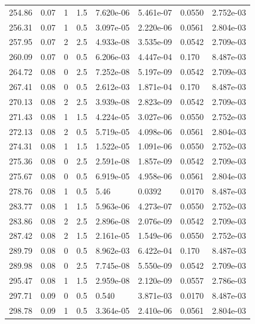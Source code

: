 \documentclass[preview]{standalone}
\begin{document}
{{{\begin{tabular}{L{1.2cm}C{1.2cm} C{0.3cm}C{0.5cm} C{1.4cm}C{1.4cm} C{1.4cm}C{1.4cm}}
  254.86  &  0.07  & 1     & 1.5 &  7.620e-06  & 5.461e-07  & 0.0550 &  2.752e-03   \\ 
  256.31  &  0.07  & 1     & 0.5 &  3.097e-05  & 2.220e-06  & 0.0561 &  2.804e-03   \\ 
  257.95  &  0.07  & 2     & 2.5 &  4.933e-08  & 3.535e-09  & 0.0542 &  2.709e-03   \\ 
  260.09  &  0.07  & 0     & 0.5 &  6.206e-03  & 4.447e-04  & 0.170 &  8.487e-03   \\ 
  264.72  &  0.08  & 0     & 2.5 &  7.252e-08  & 5.197e-09  & 0.0542 &  2.709e-03   \\ 
  267.41  &  0.08  & 0     & 0.5 &  2.612e-03  & 1.871e-04  & 0.170 &  8.487e-03   \\ 
  270.13  &  0.08  & 2     & 2.5 &  3.939e-08  & 2.823e-09  & 0.0542 &  2.709e-03   \\ 
  271.43  &  0.08  & 1     & 1.5 &  4.224e-05  & 3.027e-06  & 0.0550 &  2.752e-03   \\ 
  272.13  &  0.08  & 2     & 0.5 &  5.719e-05  & 4.098e-06  & 0.0561 &  2.804e-03   \\ 
  274.31  &  0.08  & 1     & 1.5 &  1.522e-05  & 1.091e-06  & 0.0550 &  2.752e-03   \\ 
  275.36  &  0.08  & 0     & 2.5 &  2.591e-08  & 1.857e-09  & 0.0542 &  2.709e-03   \\ 
  275.67  &  0.08  & 0     & 0.5 &  6.919e-05  & 4.958e-06  & 0.0561 &  2.804e-03   \\ 
  278.76  &  0.08  & 1     & 0.5 &  5.46  & 0.0392  & 0.0170 &  8.487e-03   \\ 
  283.77  &  0.08  & 1     & 1.5 &  5.963e-06  & 4.273e-07  & 0.0550 &  2.752e-03   \\ 
  283.86  &  0.08  & 2     & 2.5 &  2.896e-08  & 2.076e-09  & 0.0542 &  2.709e-03   \\ 
  287.42  &  0.08  & 2     & 1.5 &  2.161e-05  & 1.549e-06  & 0.0550 &  2.752e-03   \\ 
  289.79  &  0.08  & 0     & 0.5 &  8.962e-03  & 6.422e-04  & 0.170 &  8.487e-03   \\ 
  289.98  &  0.08  & 0     & 2.5 &  7.745e-08  & 5.550e-09  & 0.0542 &  2.709e-03   \\ 
  295.47  &  0.08  & 1     & 1.5 &  2.959e-08  & 2.120e-09  & 0.0557 &  2.786e-03   \\ 
  297.71  &  0.09  & 0     & 0.5 &  0.540  & 3.871e-03  & 0.0170 &  8.487e-03   \\ 
  298.78  &  0.09  & 1     & 0.5 &  3.364e-05  & 2.410e-06  & 0.0561 &  2.804e-03   \\ 

\end{tabular}}}}
\end{document}
